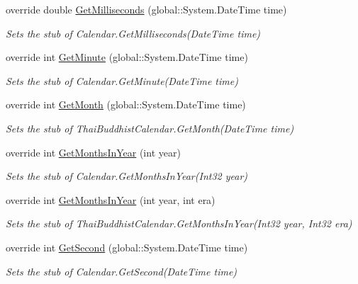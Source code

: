 \begin{DoxyCompactItemize}
override double \hyperlink{class_system_1_1_globalization_1_1_fakes_1_1_stub_thai_buddhist_calendar_a0fa85ff8d8f53398a49b0b49b7a60ef4}{Get\-Milliseconds} (global\-::\-System.\-Date\-Time time)
\begin{DoxyCompactList}\small\item\em Sets the stub of Calendar.\-Get\-Milliseconds(\-Date\-Time time)\end{DoxyCompactList}\item 
override int \hyperlink{class_system_1_1_globalization_1_1_fakes_1_1_stub_thai_buddhist_calendar_abfcb840316f083d576c1bb95827d2d5c}{Get\-Minute} (global\-::\-System.\-Date\-Time time)
\begin{DoxyCompactList}\small\item\em Sets the stub of Calendar.\-Get\-Minute(\-Date\-Time time)\end{DoxyCompactList}\item 
override int \hyperlink{class_system_1_1_globalization_1_1_fakes_1_1_stub_thai_buddhist_calendar_aa9baa1d5ccbc89b8cd2824de3aa25906}{Get\-Month} (global\-::\-System.\-Date\-Time time)
\begin{DoxyCompactList}\small\item\em Sets the stub of Thai\-Buddhist\-Calendar.\-Get\-Month(\-Date\-Time time)\end{DoxyCompactList}\item 
override int \hyperlink{class_system_1_1_globalization_1_1_fakes_1_1_stub_thai_buddhist_calendar_a7fbbc7eaee524b2c6510f5eefc89856a}{Get\-Months\-In\-Year} (int year)
\begin{DoxyCompactList}\small\item\em Sets the stub of Calendar.\-Get\-Months\-In\-Year(\-Int32 year)\end{DoxyCompactList}\item 
override int \hyperlink{class_system_1_1_globalization_1_1_fakes_1_1_stub_thai_buddhist_calendar_ae86b157e23a5aba849aad2d1333c8df1}{Get\-Months\-In\-Year} (int year, int era)
\begin{DoxyCompactList}\small\item\em Sets the stub of Thai\-Buddhist\-Calendar.\-Get\-Months\-In\-Year(\-Int32 year, Int32 era)\end{DoxyCompactList}\item 
override int \hyperlink{class_system_1_1_globalization_1_1_fakes_1_1_stub_thai_buddhist_calendar_a5dfbf6289287f65c224ec5f006b3119b}{Get\-Second} (global\-::\-System.\-Date\-Time time)
\begin{DoxyCompactList}\small\item\em Sets the stub of Calendar.\-Get\-Second(\-Date\-Time time)\end{DoxyCompactList}\item 

\end{DoxyCompactItemize}
